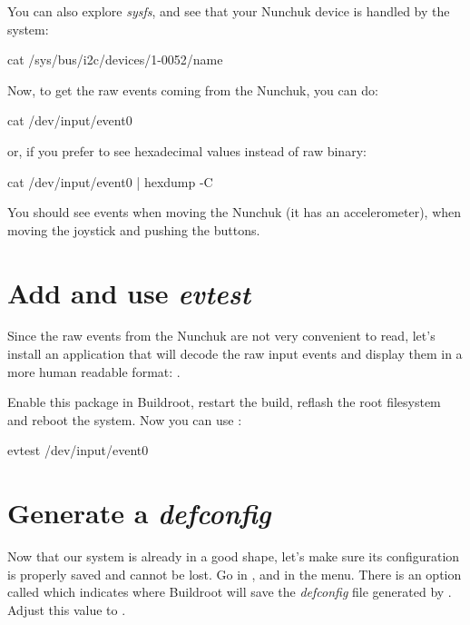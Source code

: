 You can also explore {\em sysfs}, and see that your Nunchuk device is
handled by the system:

\begin{bashinput}
cat /sys/bus/i2c/devices/1-0052/name
\end{bashinput}

Now, to get the raw events coming from the Nunchuk, you can do:

\begin{bashinput}
cat /dev/input/event0
\end{bashinput}

or, if you prefer to see hexadecimal values instead of raw binary:

\begin{bashinput}
cat /dev/input/event0 | hexdump -C
\end{bashinput}

You should see events when moving the Nunchuk (it has an
accelerometer), when moving the joystick and pushing the buttons.

\section{Add and use {\em evtest}}

Since the raw events from the Nunchuk are not very convenient to read,
let's install an application that will decode the raw input events
and display them in a more human readable format: .

Enable this package in Buildroot, restart the build, reflash the root
filesystem and reboot the system. Now you can use :

\begin{bashinput}
evtest /dev/input/event0
\end{bashinput}

\section{Generate a {\em defconfig}}

Now that our system is already in a good shape, let's make sure its
configuration is properly saved and cannot be lost. Go in
, and in the  menu. There is an
option called  which indicates
where Buildroot will save the {\em defconfig} file generated by
. Adjust this value to
.

